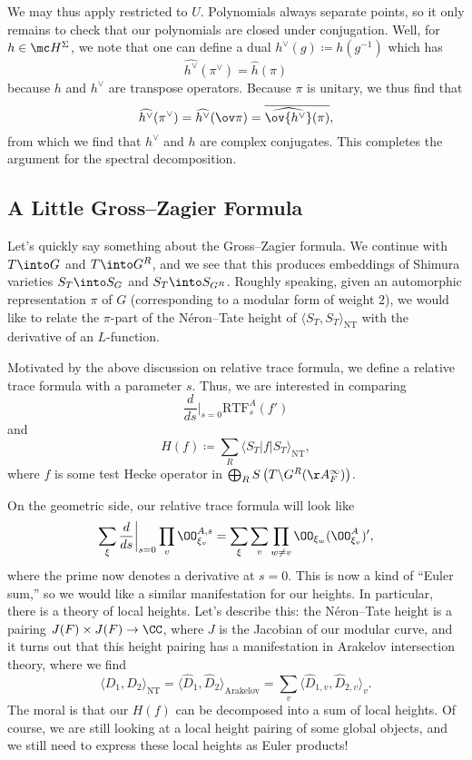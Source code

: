 \documentclass[../notes.tex]{subfiles}
\begin{document}
We may thus apply  restricted to $U$. Polynomials always separate points, so it only remains to check that our polynomials are closed under conjugation. Well, for $h\in\mc H^\Sigma$, we note that one can define a dual $h^\lor(g)\coloneqq h\left(g^{-1}\right)$ which has
\[\widehat{h^\lor}(\pi^\lor)=\widehat h(\pi)\]
because $h$ and $h^\lor$ are transpose operators. Because $\pi$ is unitary, we thus find that
\[\widehat{h^\lor}(\pi^\lor)=\widehat{h^\lor}(\ov\pi)=\overline{\widehat{\ov{h^\lor}}(\pi)},\]
from which we find that $h^\lor$ and $h$ are complex conjugates. This completes the argument for the spectral decomposition.

\subsection{A Little Gross--Zagier Formula}
Let's quickly say something about the Gross--Zagier formula. We continue with $T\into G$ and $T\into G^R$, and we see that this produces embeddings of Shimura varieties $S_T\into S_G$ and $S_T\into S_{G^R}$. Roughly speaking, given an automorphic representation $\pi$ of $G$ (corresponding to a modular form of weight $2$), we would like to relate the $\pi$-part of the N\'eron--Tate height of $\langle S_T,S_T\rangle_{\mathrm{NT}}$ with the derivative of an $L$-function.

Motivated by the above discussion on relative trace formula, we define a relative trace formula with a parameter $s$. Thus, we are interested in comparing
\[\frac d{ds}\bigg|_{s=0}\mathrm{RTF}^A_s(f')\]
and
\[H(f)\coloneqq\sum_R\langle S_T|f|S_T\rangle_{\mathrm{NT}},\]
where $f$ is some test Hecke operator in $\bigoplus_RS\left(T\backslash G^R(\AA_F^\infty)\right)$.

On the geometric side, our relative trace formula will look like
\[\sum_\xi\frac d{ds}\bigg|_{s=0}\prod_v\OO_{\xi_v}^{A,s}=\sum_\xi\sum_v\prod_{w\ne v}\OO_{\xi_w}(\OO^A_{\xi_v})',\]
where the prime now denotes a derivative at $s=0$. This is now a kind of ``Euler sum,'' so we would like a similar manifestation for our heights. In particular, there is a theory of local heights. Let's describe this: the N\'eron--Tate height is a pairing $J(F)\times J(F)\to\CC$, where $J$ is the Jacobian of our modular curve, and it turns out that this height pairing has a manifestation in Arakelov intersection theory, where we find
\[\langle D_1,D_2\rangle_{\mathrm{NT}}=\langle\widehat D_1,\widehat D_2\rangle_{\mathrm{Arakelov}}=\sum_v\langle\widehat D_{1,v},\widehat D_{2,v}\rangle_v.\]
The moral is that our $H(f)$ can be decomposed into a sum of local heights. Of course, we are still looking at a local height pairing of some global objects, and we still need to express these local heights as Euler products!
\end{document}
